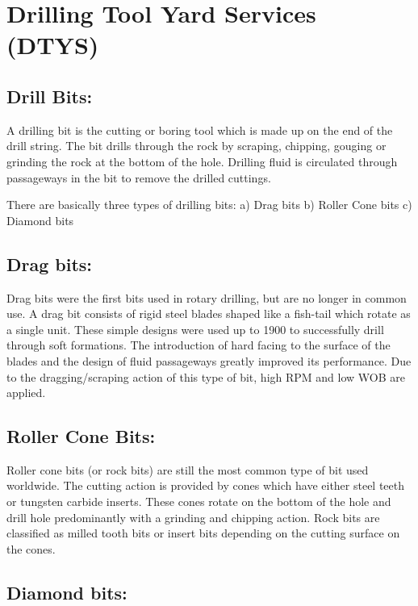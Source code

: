 \chapter{Drilling Tool Yard Services (DTYS)}

\section*{\textbf{Drill Bits:} }
A drilling bit is the cutting or boring tool which is made
up on the end of the drill string. The bit drills through the rock by
scraping, chipping, gouging or grinding the rock at the bottom of the
hole. Drilling fluid is circulated through passageways in the bit to
remove the drilled cuttings.


There are basically three types of drilling bits:
a) Drag bits
b) Roller Cone bits
c) Diamond bits

\section*{Drag bits:} 

Drag bits were the first bits used in rotary drilling, but are
no longer in common use. A drag bit consists of rigid steel blades
shaped like a fish-tail which rotate as a single unit. These simple
designs were used up to 1900 to successfully drill through soft
formations. The introduction of hard facing to the surface of the
blades and the design of fluid passageways greatly improved its
performance. Due to the dragging/scraping action of this type of bit,
high RPM and low WOB are applied.


\section*{\textbf{Roller Cone Bits:}}

Roller cone bits (or rock bits) are still the most
common type of bit used worldwide. The cutting action is provided
by cones which have either steel teeth or tungsten carbide inserts.
These cones rotate on the bottom of the hole and drill hole
predominantly with a grinding and chipping action.
Rock bits are classified as milled tooth bits or insert bits depending
on the cutting surface on the cones.

\vspace{1em}

\section*{\textbf{Diamond bits:}} 

